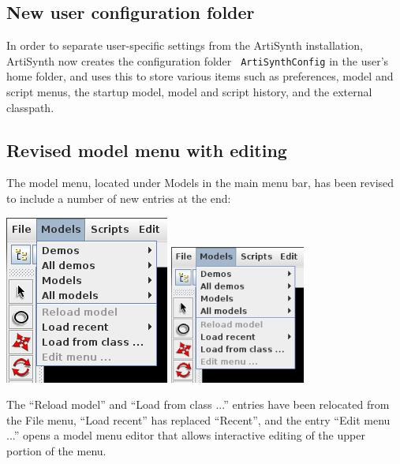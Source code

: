 \documentclass{article}
\begin{document}
\subsection*{New user configuration folder}

In order to separate user-specific settings from the ArtiSynth
installation, ArtiSynth now creates the configuration folder {\tt
ArtiSynthConfig} in the user's home folder, and uses this to store
various items such as preferences, model and script menus, the startup
model, model and script history, and the external classpath.

\subsection*{Revised model menu with editing}

The model menu, located under {\sf Models} in the main menu bar, has
been revised to include a number of new entries at the end:

\begin{center}
\iflatexml
\includegraphics[]{images/modelMenu}
\else
\includegraphics[width=1.75in]{images/modelMenu}
\fi
\end{center}

The {\sf ``Reload model''} and {\sf ``Load from class ...''}  entries
have been relocated from the {\sf File} menu, {\sf ``Load recent''}
has replaced {\sf ``Recent''}, and the entry {\sf ``Edit menu ...''}
opens a model menu editor that allows interactive editing of the
upper portion of the menu.
\end{document}
